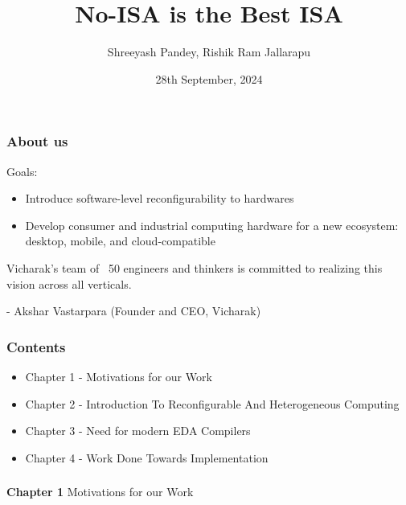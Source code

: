 \documentclass{beamer}
\title{No-ISA is the Best ISA}
\subtitle{}
\author{Shreeyash Pandey, Rishik Ram Jallarapu}
\institute{Vicharak, India @ vicharak.in}
\date{28th September, 2024}
\begin{document}
\begin{frame}
\titlepage
\end{frame}

{

\begin{frame}[fragile]
\frametitle{About us}

  Goals:
  \begin{itemize}
    \item Introduce software-level reconfigurability to hardwares
    \item Develop consumer and industrial computing hardware for a new ecosystem: desktop, mobile, and cloud-compatible
  \end{itemize}

Vicharak's team of ~50 engineers and thinkers is committed to realizing this vision across all verticals.

  - Akshar Vastarpara (Founder and CEO, Vicharak)

\framesubtitle{}
\end{frame}

\begin{frame}[fragile]
\frametitle{Contents}

  \begin{itemize}
    \item Chapter 1 - Motivations for our Work
    \item Chapter 2 - Introduction To Reconfigurable And Heterogeneous Computing
    \item Chapter 3 - Need for modern EDA Compilers
    \item Chapter 4 - Work Done Towards Implementation  
  \end{itemize}
\end{frame}

\begin{frame}[c,fragile]
  \frametitle{}
  \centering
  \textbf{Chapter 1}
  \centering
  Motivations for our Work
\end{frame}

}
\end{document}
